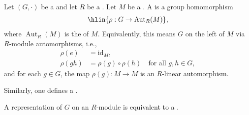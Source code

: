\begin{definition} \label{definition:representation_of_a_group_on_a_module_over_a_not_necessarily_commutative_ring}
Let $(G, \cdot)$ be a  and let $R$ be a . Let $M$ be a . A  is a group homomorphism
$$\hlin{\rho : G \to \operatorname{Aut}_R(M)},$$
where $\operatorname{Aut}_R(M)$ is the  of $M$. Equivalently, this means $G$  on the left of $M$ via $R$-module automorphisms, i.e.,
\begin{align*}
\rho(e) &= \mathrm{id}_M, \\
\rho(g h) &= \rho(g) \circ \rho(h) \quad \text{for all } g,h \in G,
\end{align*}
and for each $g \in G$, the map $\rho(g) : M \to M$ is an $R$-linear automorphism.

Similarly, one defines a .

A representation of $G$ on an $R$-module is equivalent to a . 
\end{definition}